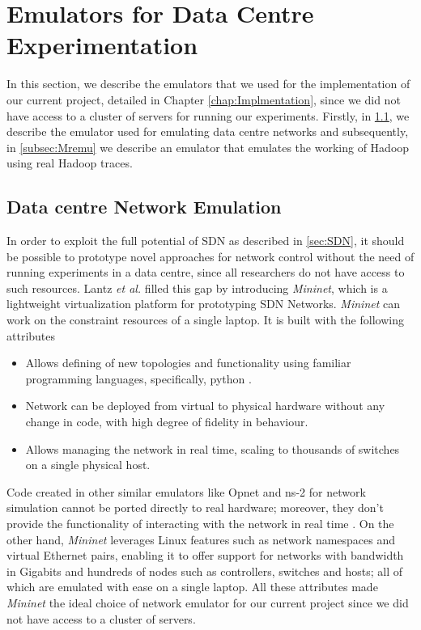 \section{Emulators for Data Centre Experimentation} \label{sec:Emulators}

In this section, we describe the emulators that we used for the implementation of our current project, detailed in Chapter \ref{chap:Implmentation}, since we did not have access to a cluster of servers for running our experiments. Firstly, in \ref{subsec:DataCentreEmulation}, we describe the emulator used for emulating data centre networks and subsequently, in \ref{subsec:Mremu} we describe an emulator that emulates the working of Hadoop \cite{HadoopWeb} using real Hadoop traces.  

\subsection{Data centre Network Emulation}  \label{subsec:DataCentreEmulation}
In order to exploit the full potential of SDN as described in \ref{sec:SDN}, it should be possible to prototype novel approaches for network control without the need of running experiments in a data centre, since all researchers do not have access to such resources. Lantz \textit{et al.} \cite{lantz2010network} filled this gap by introducing \textit{Mininet}, which is a lightweight virtualization platform for prototyping SDN Networks. \textit{Mininet} can work on the constraint resources of a single laptop. It is built with the following attributes
\begin{itemize}
	\item Allows defining of new topologies and functionality using familiar programming languages, specifically, python \cite{van2007python}.
	\item Network can be deployed from virtual to physical hardware without any change in code, with high degree of fidelity in behaviour. 
	\item Allows managing the network in real time, scaling to thousands of switches on a single physical host. 
\end{itemize} 

Code created in other similar emulators like Opnet \cite{opnetWeb} and ns-2 \cite{ns2} for network simulation cannot be ported directly to real hardware; moreover, they don't provide the functionality of interacting with the network in real time \cite{lantz2010network}. On the other hand, \textit{Mininet} leverages Linux features such as network namespaces and virtual Ethernet pairs, enabling it to offer support for networks with bandwidth in Gigabits and hundreds of nodes such as controllers, switches and hosts; all of which are emulated with ease on a single laptop. All these attributes made \textit{Mininet} the ideal choice of network emulator for our current project since we did not have access to a cluster of servers.

